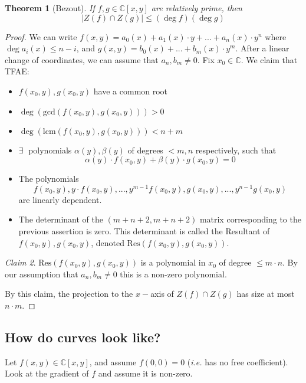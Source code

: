 \documentclass[12pt]{article}
\newtheorem{theorem}{Theorem}[section]
\theoremstyle{remark}
\newtheorem{claim}[theorem]{Claim}
\newcommand{\ie}{\emph{i.e.} }
\newcommand{\C}{\mathbb{C}}
\begin{document}
\begin{theorem}[Bezout]
If $f, g \in \C[x,y]$ are relatively prime, then $$|Z(f) \cap Z(g)| \leq (\deg f ) ( \deg g)$$
\end{theorem}

\begin{proof}
We can write $f(x,y) = a_0(x) + a_1(x) \cdot y+ ... +a_n(x) \cdot y^n$
where $\deg a_i(x) \leq n-i$, and $g(x,y) = b_0(x) + ... +b_m(x) \cdot y^m$. After a linear change of coordinates, we can assume that $a_n, b_m \neq 0$. Fix $x_0 \in \C$. We claim that TFAE:

\begin{itemize}
\item $f(x_0,y) , g(x_0,y)$ have a common root
\item $\deg ( \text{gcd}(f(x_0,y), g(x_0,y))) > 0 $
\item $\deg ( \text{lcm}(f(x_0, y), g(x_0,y))) < n+m$
\item $\exists \;$ polynomials $\alpha(y), \beta(y)$ of degrees $< m,n$ respectively, such that $$\alpha(y) \cdot f(x_0,y) + \beta(y) \cdot g(x_0,y) = 0 $$
\item The polynomials $$f(x_0,y), y \cdot f(x_0,y), ..., y^{m-1}f(x_0,y), 
 g(x_0,y), ... , y^{n-1}g(x_0,y)$$ are linearly dependent.
\item The determinant of the  $(m+n+2, m+n+2)$ matrix corresponding to the previous assertion is zero. This determinant is called the Resultant of $f(x_0,y), g(x_0,y)$, denoted $\text{Res}(f(x_0,y),g(x_0,y))$.
\end{itemize}

\begin{claim}
$\text{Res}(f(x_0,y),g(x_0,y))$ is a polynomial in $x_0$ of degree $\leq m \cdot n$. By our assumption that $a_n,b_m \neq 0$ this is a non-zero polynomial.
\end{claim}

By this claim, the projection to the $x-$axis of $Z(f) \cap Z(g)$ has size at most $n \cdot m$.

\end{proof}

\subsection{How do curves look like?}

Let $f(x,y) \in \C[x,y]$, and assume $f(0,0) = 0$ (\ie has no free coefficient). Look at the gradient of $f$ and assume it is non-zero. 
\end{document}
